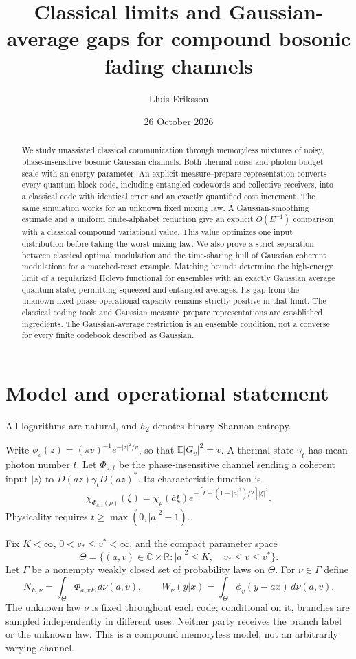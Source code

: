 \documentclass[11pt]{article}
\title{Classical limits and Gaussian-average gaps\newline
for compound bosonic fading channels}
\author{Lluis Eriksson}
\date{26 October 2026}
\newcommand{\C}{\mathbb C}
\newcommand{\E}{\mathbb E}
\begin{document}
\maketitle
\begin{abstract}
We study unassisted classical communication through memoryless mixtures
of noisy, phase-insensitive bosonic Gaussian channels. Both thermal noise
and photon budget scale with an energy parameter. An explicit
measure--prepare representation converts every quantum block code,
including entangled codewords and collective receivers, into a classical
code with identical error and an exactly quantified cost increment.
The same simulation works for an unknown fixed mixing law.
A Gaussian-smoothing estimate and a uniform finite-alphabet reduction
give an explicit \(O(E^{-1})\) comparison with a classical compound
variational value. This value optimizes one input distribution before
taking the worst mixing law. We also prove a strict separation
between classical optimal modulation and the time-sharing hull of Gaussian
coherent modulations for a matched-reset example. Matching bounds
determine the high-energy limit of a regularized Holevo functional for
ensembles with an exactly Gaussian average quantum state, permitting
squeezed and entangled averages. Its gap from the unknown-fixed-phase
operational capacity remains strictly positive in that limit.
The classical coding tools and Gaussian measure--prepare representations
are established ingredients. The Gaussian-average restriction is an
ensemble condition, not a converse for every finite codebook described
as Gaussian.
\end{abstract}

\section{Model and operational statement}

All logarithms are natural, and \(h_2\) denotes binary Shannon entropy.

Write
\(\phi_v(z)=(\pi v)^{-1}e^{-|z|^2/v}\), so that
\(\E|G_v|^2=v\). A thermal state \(\gamma_t\) has mean photon
number \(t\). Let \(\Phi_{a,t}\) be the phase-insensitive channel
sending a coherent input \(|z\rangle\) to
\(D(az)\gamma_tD(az)^*\). Its characteristic function is
\[
 \chi_{\Phi_{a,t}(\rho)}(\xi)=
 \chi_\rho(\bar a\xi)
 e^{-[t+(1-|a|^2)/2]|\xi|^2}.
\]
Physicality requires \(t\geq \max(0,|a|^2-1)\).

Fix \(K<\infty\), \(0<v_*\leq v^*<\infty\), and the compact parameter
space
\[
 \Theta=\{(a,v)\in\C\times\mathbb R: |a|^2\leq K,\quad
                                    v_*\leq v\leq v^*\}.
\]
Let \(\Gamma\) be a nonempty weakly closed set of probability laws on
\(\Theta\). For \(\nu\in\Gamma\) define
\[
 N_{E,\nu}=\int_\Theta\Phi_{a,vE}\,d\nu(a,v),\qquad
 W_\nu(y|x)=\int_\Theta\phi_v(y-ax)\,d\nu(a,v).
\]
The unknown law \(\nu\) is fixed throughout each code; conditional on it,
branches are sampled independently in different uses. Neither party
receives the branch label or the unknown law. This is a compound
memoryless model, not an arbitrarily varying channel.
\end{document}
